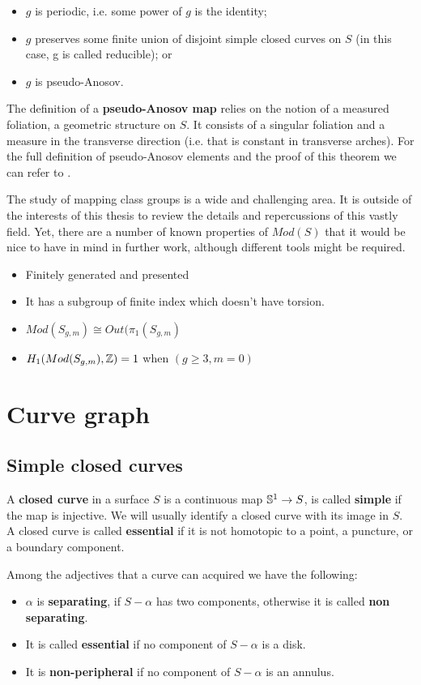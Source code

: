 \begin{itemize}
\item $g$ is periodic, i.e. some power of $g$ is the identity;
\item $g$ preserves some finite union of disjoint simple closed curves on $S$ (in this case, g is called reducible); or
\item $g$ is pseudo-Anosov.
\end{itemize}

The definition of a \textbf{pseudo-Anosov map} relies on the notion of a measured foliation, a geometric structure on $S$. It consists of a singular foliation and a measure in the transverse direction (i.e. that is constant in transverse arches). For the full definition of pseudo-Anosov elements and the proof of this theorem we can refer to \cite[Farb, ch.~13]{Farb}.

The study of mapping class groups is a wide and challenging area. It is outside of the interests of this thesis to review the details and repercussions of this vastly field. Yet, there are a number of known properties of $Mod(S)$ that it would be nice to have in mind in further work, although different tools might be required.

\begin{itemize}
\item Finitely generated and presented
\item It has a subgroup of finite index which doesn't have torsion.
\item $Mod(S_{g,m}) \cong Out(\pi_{1}(S_{g,m})$
\item $H_{1}(Mod(S_{g,m}), \Z) = 1$ when $(g\geq3, m=0)$
\end{itemize}

\section{Curve graph}

\subsection{Simple closed curves}

\begin{defini}
A \textbf{closed curve} in a surface $S$ is a continuous map $\S^{1}\to S$, is called \textbf{simple} if the map is injective. We will usually identify a closed curve with its image in $S$. A closed curve is called \textbf{essential} if it is not homotopic to a point, a puncture, or a boundary component.
\end{defini}
Among the adjectives that a curve can acquired we have the following:
\begin{itemize}
    \item $\alpha$ is \textbf{separating}, if $S-\alpha$ has two components, otherwise it is called \textbf{non separating}.
    \item It is called \textbf{essential} if no component of $S- \alpha$ is a disk.
    \item It is \textbf{non-peripheral} if no component of $S - \alpha$ is an annulus. 
\end{itemize}

